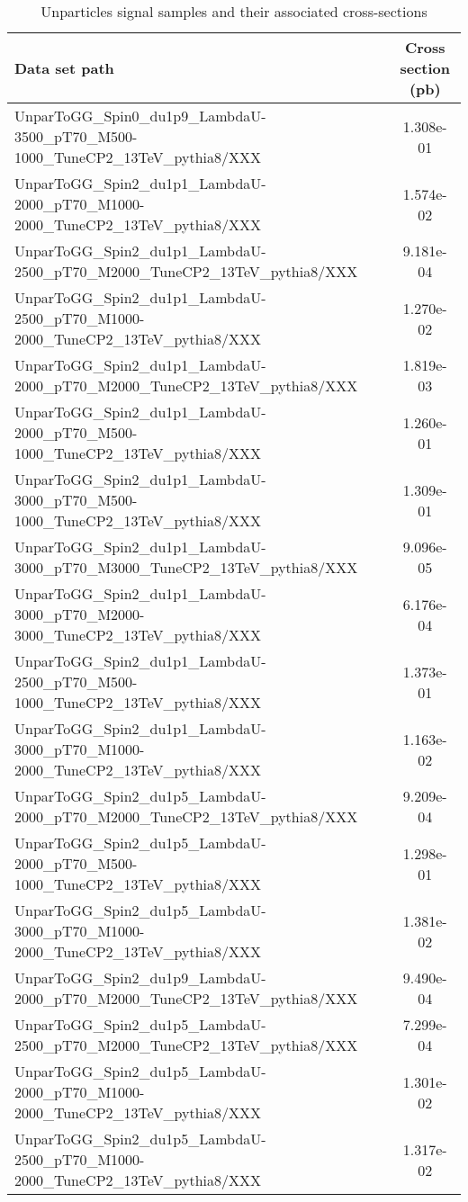 \begin{landscape}
\begin{table}[!htbp]
       \caption{ Unparticles signal samples and their associated cross-sections }
       \centering
       \vspace{\baselineskip}
       \begin{tabular}{lc}
       \hline \hline
       Data set path & Cross section (pb)\\
       \hline

       UnparToGG\_Spin0\_du1p9\_LambdaU-3500\_pT70\_M500-1000\_TuneCP2\_13TeV\_pythia8/XXX & 1.308e-01\\
       UnparToGG\_Spin2\_du1p1\_LambdaU-2000\_pT70\_M1000-2000\_TuneCP2\_13TeV\_pythia8/XXX & 1.574e-02\\
       UnparToGG\_Spin2\_du1p1\_LambdaU-2500\_pT70\_M2000\_TuneCP2\_13TeV\_pythia8/XXX & 9.181e-04\\
       UnparToGG\_Spin2\_du1p1\_LambdaU-2500\_pT70\_M1000-2000\_TuneCP2\_13TeV\_pythia8/XXX & 1.270e-02\\
       UnparToGG\_Spin2\_du1p1\_LambdaU-2000\_pT70\_M2000\_TuneCP2\_13TeV\_pythia8/XXX & 1.819e-03\\
       UnparToGG\_Spin2\_du1p1\_LambdaU-2000\_pT70\_M500-1000\_TuneCP2\_13TeV\_pythia8/XXX & 1.260e-01\\
       UnparToGG\_Spin2\_du1p1\_LambdaU-3000\_pT70\_M500-1000\_TuneCP2\_13TeV\_pythia8/XXX & 1.309e-01\\
       UnparToGG\_Spin2\_du1p1\_LambdaU-3000\_pT70\_M3000\_TuneCP2\_13TeV\_pythia8/XXX & 9.096e-05\\
       UnparToGG\_Spin2\_du1p1\_LambdaU-3000\_pT70\_M2000-3000\_TuneCP2\_13TeV\_pythia8/XXX & 6.176e-04\\
       UnparToGG\_Spin2\_du1p1\_LambdaU-2500\_pT70\_M500-1000\_TuneCP2\_13TeV\_pythia8/XXX & 1.373e-01\\
       UnparToGG\_Spin2\_du1p1\_LambdaU-3000\_pT70\_M1000-2000\_TuneCP2\_13TeV\_pythia8/XXX & 1.163e-02\\
       UnparToGG\_Spin2\_du1p5\_LambdaU-2000\_pT70\_M2000\_TuneCP2\_13TeV\_pythia8/XXX & 9.209e-04\\
       UnparToGG\_Spin2\_du1p5\_LambdaU-2000\_pT70\_M500-1000\_TuneCP2\_13TeV\_pythia8/XXX & 1.298e-01\\
       UnparToGG\_Spin2\_du1p5\_LambdaU-3000\_pT70\_M1000-2000\_TuneCP2\_13TeV\_pythia8/XXX & 1.381e-02\\
       UnparToGG\_Spin2\_du1p9\_LambdaU-2000\_pT70\_M2000\_TuneCP2\_13TeV\_pythia8/XXX & 9.490e-04\\
       UnparToGG\_Spin2\_du1p5\_LambdaU-2500\_pT70\_M2000\_TuneCP2\_13TeV\_pythia8/XXX & 7.299e-04\\
       UnparToGG\_Spin2\_du1p5\_LambdaU-2000\_pT70\_M1000-2000\_TuneCP2\_13TeV\_pythia8/XXX & 1.301e-02\\
       UnparToGG\_Spin2\_du1p5\_LambdaU-2500\_pT70\_M1000-2000\_TuneCP2\_13TeV\_pythia8/XXX & 1.317e-02\\
     


\end{tabular}
\end{table}
\end{landscape}
